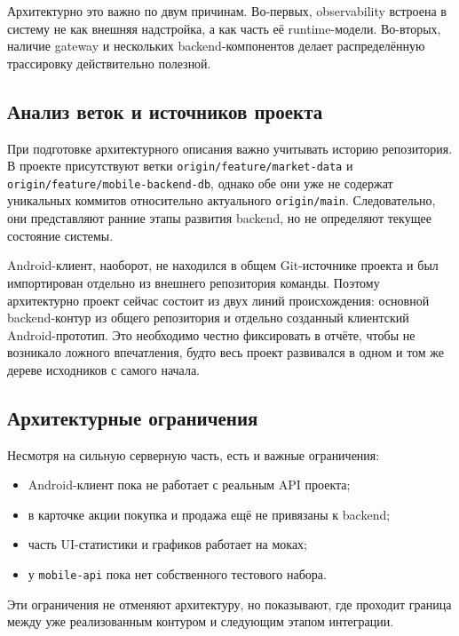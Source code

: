 \documentclass[12pt,a4paper]{article}
\begin{document}
Архитектурно это важно по двум причинам. Во-первых, observability встроена в систему не как внешняя надстройка, а как часть её runtime-модели. Во-вторых, наличие gateway и нескольких backend-компонентов делает распределённую трассировку действительно полезной.

\subsection{Анализ веток и источников проекта}

При подготовке архитектурного описания важно учитывать историю репозитория. В проекте присутствуют ветки \texttt{origin/feature/market-data} и \texttt{origin/feature/mobile-backend-db}, однако обе они уже не содержат уникальных коммитов относительно актуального \texttt{origin/main}. Следовательно, они представляют ранние этапы развития backend, но не определяют текущее состояние системы.

Android-клиент, наоборот, не находился в общем Git-источнике проекта и был импортирован отдельно из внешнего репозитория команды. Поэтому архитектурно проект сейчас состоит из двух линий происхождения: основной backend-контур из общего репозитория и отдельно созданный клиентский Android-прототип. Это необходимо честно фиксировать в отчёте, чтобы не возникало ложного впечатления, будто весь проект развивался в одном и том же дереве исходников с самого начала.

\subsection{Архитектурные ограничения}

Несмотря на сильную серверную часть, есть и важные ограничения:

\begin{itemize}[leftmargin=1.2cm]
    \item Android-клиент пока не работает с реальным API проекта;
    \item в карточке акции покупка и продажа ещё не привязаны к backend;
    \item часть UI-статистики и графиков работает на моках;
    \item у \texttt{mobile-api} пока нет собственного тестового набора.
\end{itemize}

Эти ограничения не отменяют архитектуру, но показывают, где проходит граница между уже реализованным контуром и следующим этапом интеграции.
\end{document}
